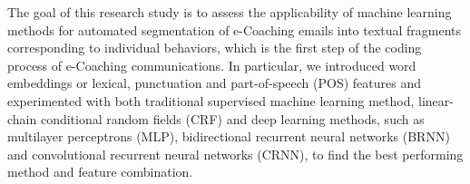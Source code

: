 \documentclass{amia}
\begin{document}
The goal of this research study is to assess the applicability of machine learning methods for automated segmentation of e-Coaching emails into textual fragments corresponding to individual behaviors, which is the first step of the coding process of e-Coaching communications. In particular, we introduced word embeddings or lexical, punctuation and  part-of-speech (POS) features and experimented with both traditional supervised machine learning method, linear-chain conditional random fields (CRF)\cite{lafferty2001conditional} and deep learning methods, such as multilayer perceptrons (MLP),\cite{rumelhart1986learning} bidirectional recurrent neural networks (BRNN)\cite{schuster1997bidirectional} and convolutional recurrent neural networks (CRNN),\cite{treviso2017sentence} to find the best performing method and feature combination. 
\end{document}
